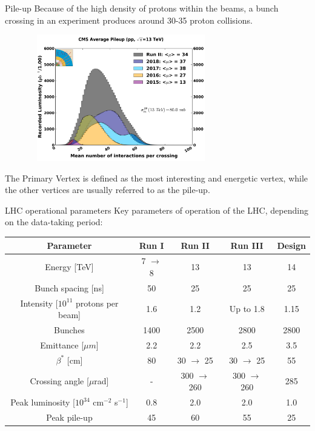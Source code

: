 \documentclass[8pt]{beamer}
\begin{document}
\begin{frame}{Pile-up}
\justifying
\vspace{5pt}
Because of the high density of protons within the beams, a bunch crossing in an experiment produces around 30-35 proton collisions. \vfill

\begin{figure}[htbp]
\begin{center}
\includegraphics[width=8cm, height=5.5cm]{figs/PUSummary.png}
\end{center}
\end{figure} \vfill

The Primary Vertex is defined as the most interesting and energetic vertex, while the other vertices are usually referred to as the pile-up. \vfill
\end{frame}

\begin{frame}{LHC operational parameters}
\justifying
Key parameters of operation of the LHC, depending on the data-taking period:

\begin{table}
\begin{center}
\begin{tabular}{ c|c|c|c|c } 
 \hline
 Parameter & Run I & Run II & Run III & Design \\
\hline
Energy [TeV] & 7 $\rightarrow$ 8 & 13 & 13 & 14 \\
Bunch spacing [ns] & 50 & 25 & 25 & 25 \\
Intensity [$10^{11}$ protons per beam] & 1.6 & 1.2 & Up to 1.8 & 1.15 \\
Bunches & 1400 & 2500 & 2800 & 2800 \\
Emittance [$\mu m$] & 2.2 & 2.2 & 2.5 & 3.5 \\
$\beta^*$ [cm] & 80 & 30 $\rightarrow$ 25 & 30 $\rightarrow$ 25 & 55 \\
Crossing angle [$\mu$rad] & - & 300 $\rightarrow$ 260 & 300 $\rightarrow$ 260 & 285 \\
Peak luminosity [$10^{34}$ cm$^{-2}$ s$^{-1}$] & 0.8 & 2.0 & 2.0 & 1.0 \\
Peak pile-up & 45 & 60 & 55 & 25 \\
 \hline
\end{tabular}
\end{center}
\end{table}
\end{frame}
\end{document}
